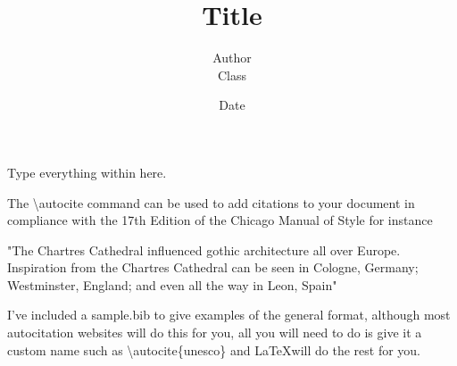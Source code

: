 \documentclass[letterpaper,12pt]{article}
\begin{document}
\title{\vspace{2in}\normalsize Title\vspace{2in}}
\author{\normalsize Author \\[-0.3in] \normalsize Class}
\date{\vspace{-0.25in}\normalsize Date}
\maketitle
{}
\newpage

Type everything within here. 

The \textbackslash autocite{} command can be used to add citations to your document in compliance with the 17th Edition of the Chicago Manual of Style for instance 

"The Chartres Cathedral influenced gothic architecture all over Europe.
Inspiration from the Chartres Cathedral can be seen in Cologne, Germany; Westminster, England; and even all the way in Leon, Spain\autocite{simson}"

I've included a sample.bib to give examples of the general format, although most autocitation websites will do this for you, all you will need to do is give it a custom name such as \textbackslash autocite\{unesco\} and \LaTeX will do the rest for you.


\newpage
\printbibliography
\end{document}
